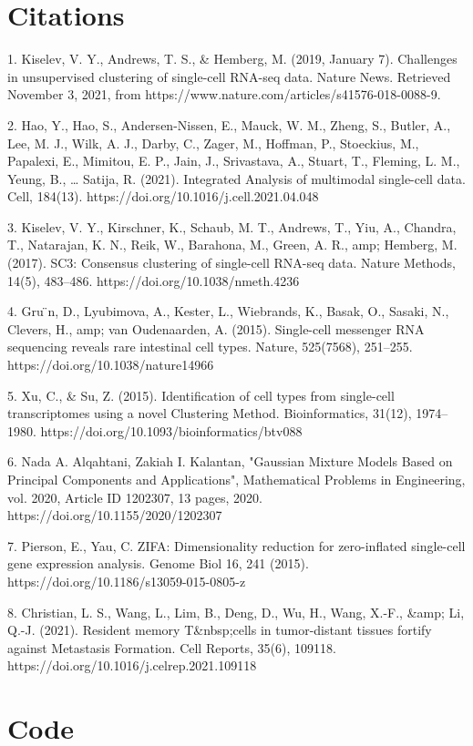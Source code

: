 \documentclass[12pt]{article}
\theoremstyle{definition}
\begin{document}
\section*{Citations}
1. Kiselev, V. Y., Andrews, T. S., & Hemberg, M. (2019, January 7). Challenges in unsupervised clustering of single-cell RNA-seq data. Nature News. Retrieved November 3, 2021, from https://www.nature.com/articles/s41576-018-0088-9. 

2. Hao, Y., Hao, S., Andersen-Nissen, E., Mauck, W. M., Zheng, S., Butler, A., Lee, M. J., Wilk, A. J., Darby, C., Zager, M., Hoffman, P., Stoeckius, M., Papalexi, E., Mimitou, E. P., Jain, J., Srivastava, A., Stuart, T., Fleming, L. M., Yeung, B., … Satija, R. (2021). Integrated Analysis of multimodal single-cell data. Cell, 184(13). https://doi.org/10.1016/j.cell.2021.04.048 

3. Kiselev, V. Y., Kirschner, K., Schaub, M. T., Andrews, T., Yiu, A., Chandra, T., Natarajan, K. N., Reik, W., Barahona, M., Green, A. R., amp; Hemberg, M. (2017). SC3: Consensus clustering of single-cell RNA-seq data. Nature Methods, 14(5), 483–486. https://doi.org/10.1038/nmeth.4236

4. Gru ̈n, D., Lyubimova, A., Kester, L., Wiebrands, K., Basak, O., Sasaki, N., Clevers, H., amp; van Oudenaarden, A. (2015). Single-cell messenger RNA sequencing reveals rare intestinal cell types. Nature, 525(7568), 251–255. https://doi.org/10.1038/nature14966

5. Xu, C., & Su, Z. (2015). Identification of cell types from single-cell transcriptomes using a novel Clustering Method. Bioinformatics, 31(12), 1974–1980. https://doi.org/10.1093/bioinformatics/btv088 

6. Nada A. Alqahtani, Zakiah I. Kalantan, "Gaussian Mixture Models Based on Principal Components and Applications", Mathematical Problems in Engineering, vol. 2020, Article ID 1202307, 13 pages, 2020. https://doi.org/10.1155/2020/1202307

7. Pierson, E., Yau, C. ZIFA: Dimensionality reduction for zero-inflated single-cell gene expression analysis. Genome Biol 16, 241 (2015). https://doi.org/10.1186/s13059-015-0805-z

8. Christian, L. S., Wang, L., Lim, B., Deng, D., Wu, H., Wang, X.-F., &amp; Li, Q.-J. (2021). Resident memory T&nbsp;cells in tumor-distant tissues fortify against Metastasis Formation. Cell Reports, 35(6), 109118. https://doi.org/10.1016/j.celrep.2021.109118 

\section*{Code}
\end{document}
